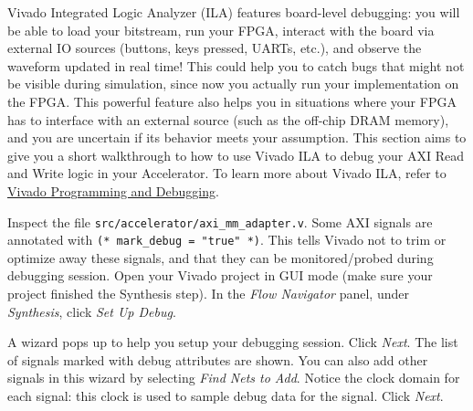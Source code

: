 \documentclass[11pt]{article}
\begin{document}
Vivado Integrated Logic Analyzer (ILA) features board-level debugging: you will be able to load your bitstream, run your FPGA, interact with the board via external IO sources (buttons, keys pressed, UARTs, etc.), and observe the waveform updated in real time! This could help you to catch bugs that might not be visible during simulation, since now you actually run your implementation on the FPGA. This powerful feature also helps you in situations where your FPGA has to interface with an external source (such as the off-chip DRAM memory), and you are uncertain if its behavior meets your assumption. This section aims to give you a short walkthrough to how to use Vivado ILA to debug your AXI Read and Write logic in your Accelerator. To learn more about Vivado ILA, refer to \href{https://www.xilinx.com/support/documentation/sw_manuals/xilinx2019_2/ug908-vivado-programming-debugging.pdf}{Vivado Programming and Debugging}.

Inspect the file \verb|src/accelerator/axi_mm_adapter.v|. Some AXI signals are annotated with \verb|(* mark_debug = "true" *)|. This tells Vivado not to trim or optimize away these signals, and that they can be monitored/probed during debugging session. Open your Vivado project in GUI mode (make sure your project finished the Synthesis step). In the \emph{Flow Navigator} panel, under \emph{Synthesis}, click \emph{Set Up Debug}.

\begin{center}
\end{center}

A wizard pops up to help you setup your debugging session. Click \emph{Next}. The list of signals marked with debug attributes are shown. You can also add other signals in this wizard by selecting \emph{Find Nets to Add}. Notice the clock domain for each signal: this clock is used to sample debug data for the signal. Click \emph{Next}.
\end{document}
